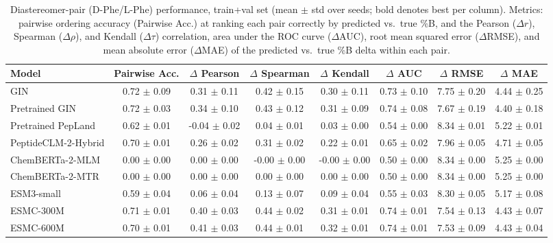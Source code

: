 \begin{table}[htbp]
  \caption{Diastereomer-pair (D-Phe/L-Phe) performance, train+val set (mean $\pm$ std over seeds; bold denotes best per column). Metrics: pairwise ordering accuracy (Pairwise Acc.) at ranking each pair correctly by predicted vs.\ true \%B, and the Pearson ($\Delta r$), Spearman ($\Delta\rho$), and Kendall ($\Delta\tau$) correlation, area under the ROC curve ($\Delta$AUC), root mean squared error ($\Delta$RMSE), and mean absolute error ($\Delta$MAE) of the predicted vs.\ true \%B delta within each pair.}
  \label{tab:diastereomer_trainval_performance}
  \centering
  \scriptsize
  \setlength{\tabcolsep}{6pt}
  \begin{tabular}{lccccccc}
    \toprule
    \textbf{Model} & \textbf{Pairwise Acc.} & \textbf{$\Delta$ Pearson} & \textbf{$\Delta$ Spearman} & \textbf{$\Delta$ Kendall} & \textbf{$\Delta$ AUC} & \textbf{$\Delta$ RMSE} & \textbf{$\Delta$ MAE} \\
    \midrule
    GIN & 0.72 $\pm$ 0.09 & 0.31 $\pm$ 0.11 & 0.42 $\pm$ 0.15 & 0.30 $\pm$ 0.11 & 0.73 $\pm$ 0.10 & 7.75 $\pm$ 0.20 & 4.44 $\pm$ 0.25 \\
    Pretrained GIN & 0.72 $\pm$ 0.03 & 0.34 $\pm$ 0.10 & 0.43 $\pm$ 0.12 & 0.31 $\pm$ 0.09 & 0.74 $\pm$ 0.08 & 7.67 $\pm$ 0.19 & 4.40 $\pm$ 0.18 \\
    Pretrained PepLand & 0.62 $\pm$ 0.01 & -0.04 $\pm$ 0.02 & 0.04 $\pm$ 0.01 & 0.03 $\pm$ 0.00 & 0.54 $\pm$ 0.00 & 8.34 $\pm$ 0.01 & 5.22 $\pm$ 0.01 \\
    PeptideCLM-2-Hybrid & 0.70 $\pm$ 0.01 & 0.26 $\pm$ 0.02 & 0.31 $\pm$ 0.02 & 0.22 $\pm$ 0.01 & 0.65 $\pm$ 0.02 & 7.96 $\pm$ 0.05 & 4.71 $\pm$ 0.05 \\
    ChemBERTa-2-MLM & 0.00 $\pm$ 0.00 & 0.00 $\pm$ 0.00 & -0.00 $\pm$ 0.00 & -0.00 $\pm$ 0.00 & 0.50 $\pm$ 0.00 & 8.34 $\pm$ 0.00 & 5.25 $\pm$ 0.00 \\
    ChemBERTa-2-MTR & 0.00 $\pm$ 0.00 & 0.00 $\pm$ 0.00 & 0.00 $\pm$ 0.00 & 0.00 $\pm$ 0.00 & 0.50 $\pm$ 0.00 & 8.34 $\pm$ 0.00 & 5.25 $\pm$ 0.00 \\
    ESM3-small & 0.59 $\pm$ 0.04 & 0.06 $\pm$ 0.04 & 0.13 $\pm$ 0.07 & 0.09 $\pm$ 0.04 & 0.55 $\pm$ 0.03 & 8.30 $\pm$ 0.05 & 5.17 $\pm$ 0.08 \\
    ESMC-300M & 0.71 $\pm$ 0.01 & 0.40 $\pm$ 0.03 & 0.44 $\pm$ 0.02 & 0.31 $\pm$ 0.01 & 0.74 $\pm$ 0.01 & 7.54 $\pm$ 0.13 & 4.43 $\pm$ 0.07 \\
    ESMC-600M & 0.70 $\pm$ 0.01 & 0.41 $\pm$ 0.03 & 0.44 $\pm$ 0.01 & 0.32 $\pm$ 0.01 & 0.74 $\pm$ 0.01 & 7.53 $\pm$ 0.09 & 4.43 $\pm$ 0.04 \\

\end{tabular}
\end{table}
